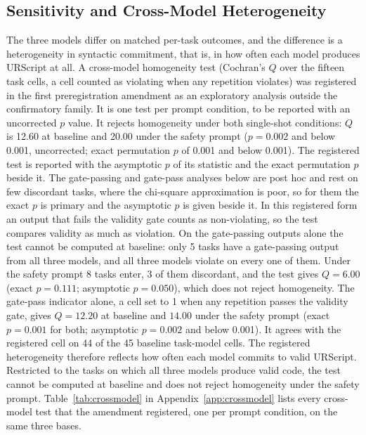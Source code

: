 \documentclass{ieeeaccess}
\begin{document}
\subsection{Sensitivity and Cross-Model Heterogeneity}\label{sec:res-sens}
The three models differ on matched per-task outcomes, and the difference is a
heterogeneity in syntactic commitment, that is, in how often each model produces URScript
at all. A cross-model homogeneity test (Cochran's $Q$ over the fifteen task cells, a cell
counted as violating when any repetition violates) was registered in the first
preregistration amendment as an exploratory analysis outside the confirmatory family. It is
one test per prompt condition, to be reported with an uncorrected $p$ value. It rejects
homogeneity under both single-shot conditions: $Q$ is 12.60 at baseline and 20.00 under
the safety prompt ($p = 0.002$ and below 0.001, uncorrected; exact permutation $p$ of 0.001
and below 0.001). The registered test is reported with the asymptotic $p$ of its statistic
and the exact permutation $p$ beside it. The gate-passing and gate-pass analyses below are
post hoc and rest on few discordant tasks, where the chi-square approximation is poor, so for
them the exact $p$ is primary and the asymptotic $p$ is given beside it. In this
registered form an output that fails the validity gate counts as non-violating, so the test
compares validity as much as violation. On the gate-passing outputs alone the test cannot
be computed at baseline: only 5 tasks have a gate-passing output from all three models,
and all three models violate on every one of them. Under the safety prompt 8 tasks enter,
3 of them discordant, and the test gives $Q = 6.00$ (exact $p = 0.111$; asymptotic
$p = 0.050$), which does not reject homogeneity. The
gate-pass indicator alone, a cell set to 1 when any repetition passes the validity gate,
gives $Q = 12.20$ at baseline and $14.00$ under the safety prompt (exact $p = 0.001$ for
both; asymptotic $p = 0.002$ and below 0.001). It agrees with the registered cell on 44 of
the 45 baseline task-model cells. The registered heterogeneity therefore reflects how often
each model commits to valid URScript. Restricted to the tasks on which all three models
produce valid code, the test cannot be computed at baseline and does not reject homogeneity
under the safety prompt.
Table~\ref{tab:crossmodel} in Appendix~\ref{app:crossmodel} lists every cross-model test
that the amendment registered, one per prompt condition, on the same three bases.
\end{document}
